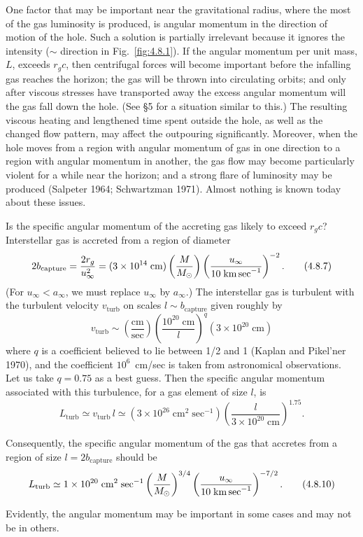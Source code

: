 One factor that may be important near the gravitational radius, where the most
of the gas luminosity is produced, is angular momentum in the direction of motion of the hole.
Such a solution is partially irrelevant because it ignores the intensity
($\sim$ direction in Fig.~\ref{fig:4.8.1}). If the angular momentum per unit mass, $L$, exceeds
$r_g c$, then centrifugal forces will become important before the infalling gas reaches
the horizon; the gas will be thrown into circulating orbits; and only after viscous
stresses have transported away the excess angular momentum will the gas fall
down the hole. (See \S5 for a situation similar to this.) The resulting viscous
heating and lengthened time spent outside the hole, as well as the changed flow
pattern, may affect the outpouring significantly. Moreover, when the
hole moves from a region with angular momentum of gas in one direction to a
region with angular momentum in another, the gas flow may become particularly
violent for a while near the horizon; and a strong flare of luminosity may be
produced (Salpeter 1964; Schwartzman 1971). Almost nothing is known today
about these issues.

Is the specific angular momentum of the accreting gas likely to exceed $r_g c$?
Interstellar gas is accreted from a region of diameter
\begin{equation}
2 b_{\text{capture}} = \frac{2r_g}{u_\infty^2} = (3 \times 10^{14}\;\text{cm})
\left(\frac{M}{M_\odot}\right)
\left(\frac{u_\infty}{10\;\text{km\,sec}^{-1}}\right)^{-2}. \tag{4.8.7}
\end{equation}
(For $u_\infty < a_\infty$, we must replace $u_\infty$ by $a_\infty$.) The interstellar gas is turbulent with
the turbulent velocity $v_{\text{turb}}$ on scales $l \sim b_{\text{capture}}$ given roughly by
\begin{equation}
v_{\text{turb}} \sim \left(\frac{\text{cm}}{\text{sec}}\right)
\left(\frac{10^{20}\;\text{cm}}{l}\right)^q
\left(3 \times 10^{20}\;\text{cm}\right)  \tag{4.8.8}
\end{equation}
where $q$ is a coefficient believed to lie between 1/2 and 1 (Kaplan and Pikel'ner
1970), and the coefficient $10^6$~cm/sec is taken from astronomical observations.
Let us take $q = 0.75$ as a best guess. Then the specific angular momentum
associated with this turbulence, for a gas element of size $l$, is
\begin{equation}
L_{\text{turb}} \simeq v_{\text{turb}} \, l
\simeq \left(3 \times 10^{26}\;\text{cm}^2\;\text{sec}^{-1}\right)
\left(\frac{l}{3 \times 10^{20}\;\text{cm}}\right)^{1.75}. \tag{4.8.9}
\end{equation}

Consequently, the specific angular momentum of the gas that accretes from a
region of size $l = 2b_{\text{capture}}$ should be
\begin{equation}
L_{\text{turb}} \simeq 1 \times 10^{20}\;\text{cm}^2\;\text{sec}^{-1}
\left(\frac{M}{M_\odot}\right)^{3/4}
\left(\frac{u_\infty}{10\;\text{km\,sec}^{-1}}\right)^{-7/2}. \tag{4.8.10}
\end{equation}

Evidently, the angular momentum may be important in some cases and may not
be in others.
